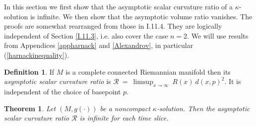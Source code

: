 \documentclass[12pt]{amsart}
\numberwithin{equation}{section}
\theoremstyle{plain}
\newtheorem{theorem}[equation]{Theorem}
\theoremstyle{definition}
\newtheorem{definition}[equation]{Definition}
\theoremstyle{remark}
\begin{document}
In this section we first show that the asymptotic scalar curvature ratio of
a $\kappa$-solution is infinite.  We then show that the asymptotic
volume ratio vanishes. The proofs are somewhat rearranged from
those in I.11.4.  They are logically independent of
Section \ref{I.11.3}, i.e. also cover the case $n=2$. 
We will use results from
Appendices \ref{appharnack} and \ref{Alexandrov}, 
in particular (\ref{harnackinequality}).

\begin{definition}
If $M$ is a complete connected Riemannian manifold then its {\em asymptotic
scalar curvature ratio} is ${\mathcal R} \: = \:
\limsup_{x \rightarrow \infty} \: R(x) \: d(x, p)^2$. It is independent
of the choice of basepoint $p$.
\end{definition}

\begin{theorem} \label{asympscalar}
Let $(M,g(\cdot))$ be a noncompact $\kappa$-solution.
Then the asymptotic scalar curvature ratio ${\mathcal R}$
is infinite for each time slice.
\end{theorem}
\end{document}
